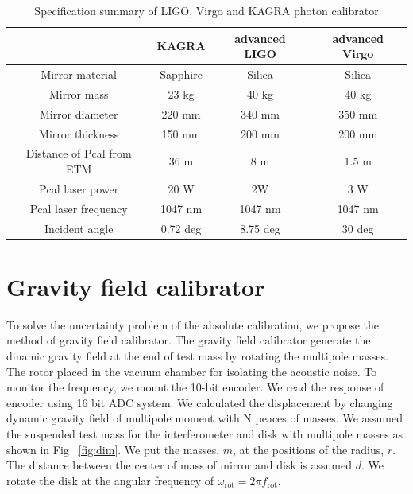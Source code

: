 \documentclass[A4]{spie}  %
\begin{document}
\begin{table}
\begin{center}
\caption{Specification summary of LIGO, Virgo and KAGRA photon calibrator\label{pcal}}
\footnotesize
\begin{tabular}{cccc}
\hline
& KAGRA& advanced LIGO& advanced Virgo \\
\hline
Mirror material & Sapphire & Silica & Silica \\
 Mirror mass & 23 kg & 40 kg & 40 kg \\
  Mirror diameter & 220 mm & 340 mm & 350 mm \\
    Mirror thickness & 150 mm & 200 mm & 200 mm \\
 Distance of Pcal from ETM & 36 m & 8 m & 1.5 m \\
  Pcal laser power & 20 W & 2W & 3 W \\
  Pcal laser frequency & 1047 nm & 1047 nm &1047 nm\\
  Incident angle& 0.72 deg & 8.75 deg &30 deg \\
  \hline
\end{tabular}
\end{center}
\end{table}

\section{Gravity field calibrator} \label{sec:Gcal}
To solve the uncertainty problem of the absolute calibration, we propose the method of gravity field calibrator. The gravity field calibrator generate the dinamic gravity field at the end of test mass by rotating the multipole masses. The rotor placed in the vacuum chamber for isolating the acoustic noise. To monitor the frequency, we mount the 10-bit encoder. We read the response of encoder using 16 bit ADC system.
We calculated the displacement by changing dynamic gravity field of multipole moment with N peaces of masses.
We assumed the suspended test mass for the interferometer and disk with multipole masses as shown in Fig ~\ref{fig:dim}.
We put the masses, $m$, at the positions of the radius, $r$. The distance between the center of mass of mirror and disk is assumed $d$.
We rotate the disk at the angular frequency of $\omega_{\mathrm{rot}}=2\pi f_{\mathrm{rot}}$.
\end{document}

